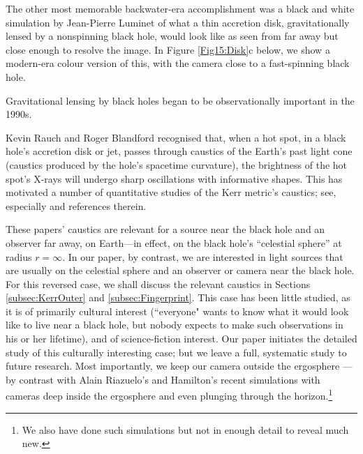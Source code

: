 \documentclass[12pt]{iopart}
\begin{document}
The other most memorable backwater-era accomplishment was a black and white simulation by Jean-Pierre Luminet \cite{Luminet78} of what a thin accretion disk, gravitationally lensed by a nonspinning black hole, would look like as seen from far away but close enough to resolve the image. In Figure \ref{Fig15:Disk}c below, we show a modern-era colour version of this, with the camera close to a fast-spinning black hole. 

Gravitational lensing by black holes began to be observationally important in the 1990s.  

Kevin Rauch and Roger Blandford \cite{Rauch94} recognised that, when a hot spot, in a black hole's accretion disk or jet, passes through caustics of the Earth's past light cone 
(caustics produced by the hole's spacetime curvature), the brightness of the hot spot's X-rays will 
undergo sharp oscillations with informative shapes.  This
has motivated a number of quantitative studies of the Kerr metric's caustics; see, especially  \cite{Rauch94,Bozza08,Bozza10} 
and references therein.

These papers' caustics are relevant for a source near the black hole and an observer far away, on Earth---in effect, on the black hole's ``celestial sphere'' at radius $r=\infty$.  In our paper, by contrast, we are interested in light sources that are usually on the
celestial sphere and an observer or camera
near the black hole.  For this reversed case, we shall discuss the relevant 
caustics in Sections \ref{subsec:KerrOuter} and \ref{subsec:Fingerprint}.   
This case has been
little studied, as it is of primarily cultural interest (``everyone" wants to know what it
would look like to live near a black hole, but nobody expects to make such 
observations in his or her lifetime), and of science-fiction interest.  Our paper
initiates the detailed study of this culturally interesting case; but we leave 
a full, systematic study to future research.  Most importantly, we keep our camera
outside the ergosphere --- by contrast with Alain Riazuelo's   \cite{Riazuelo12}
and Hamilton's \cite{Hamilton14} recent simulations with cameras deep inside the ergosphere and even plunging through the horizon.\footnote{We also have done
such simulations but not in enough detail to reveal much new.}
\end{document}
